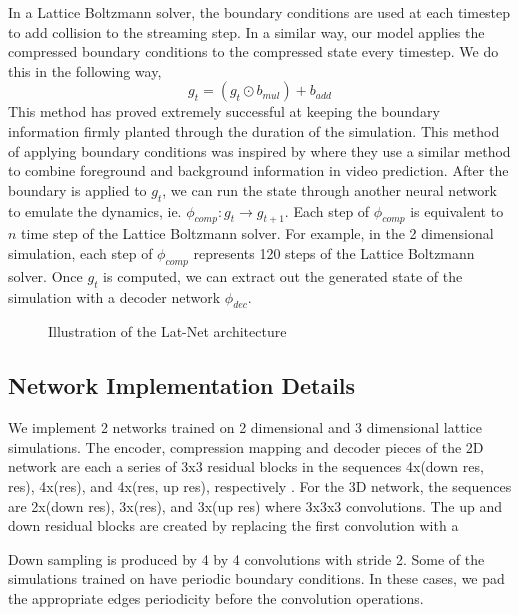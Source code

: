 \documentclass{article}
\begin{document}
In a Lattice Boltzmann solver, the boundary conditions are used at each timestep to add collision to the streaming step. In a similar way, our model applies the compressed boundary conditions to the compressed state every timestep. We do this in the following way,
\begin{equation}
  g_t = (g_t \odot b_{mul}) + b_{add}
\end{equation}
This method has proved extremely successful at keeping the boundary information firmly planted through the duration of the simulation. This method of applying boundary conditions was inspired by \cite{vondrick2016generating} where they use a similar method to combine foreground and background information in video prediction. After the boundary is applied to $g_t$, we can run the state through another neural network to emulate the dynamics, ie. $\phi_{comp}:g_{t} \rightarrow g_{t+1}$. Each step of $\phi_{comp}$ is equivalent to $n$ time step of the Lattice Boltzmann solver. For example, in the 2 dimensional simulation, each step of $\phi_{comp}$ represents 120 steps of the Lattice Boltzmann solver. Once $g_t$ is computed, we can extract out the generated state of the simulation with a decoder network $\phi_{dec}$. 

\begin{figure}[!t]
\centering
{}
\caption{Illustration of the Lat-Net architecture}
\label{fig_1}
\end{figure}

\subsection{Network Implementation Details}

We implement 2 networks trained on 2 dimensional and 3 dimensional lattice simulations. The encoder, compression mapping and decoder pieces of the 2D network are each a series of 3x3 residual blocks in the sequences 4x(down res, res), 4x(res), and 4x(res, up res), respectively \cite{he2016deep}. For the 3D network, the sequences are 2x(down res), 3x(res), and 3x(up res) where 3x3x3 convolutions. The up and down residual blocks are created by replacing the first convolution with a 

Down sampling is produced by 4 by 4 convolutions with stride 2. Some of the simulations trained on have periodic boundary conditions. In these cases, we pad the appropriate edges periodicity before the convolution operations.
\end{document}

